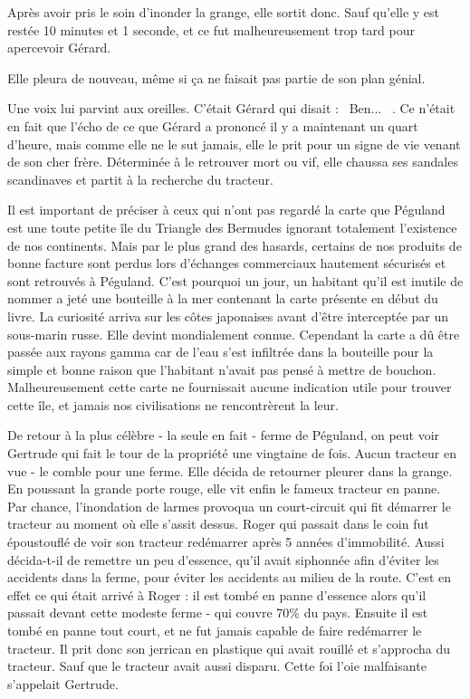 \documentclass[a5paper, 10pt, twoside]{book}
\newcommand{\cg}{\guillemotleft~}
\newcommand{\cd}{~\guillemotright}
\begin{document}
Après avoir pris le soin d’inonder la grange, elle sortit donc. Sauf qu'elle y est restée 10 minutes et 1 seconde, et ce fut malheureusement trop tard pour apercevoir Gérard.

Elle pleura de nouveau, même si ça ne faisait pas partie de son plan génial.

Une voix lui parvint aux oreilles. C'était Gérard qui disait : \cg Ben... \cd. Ce n'était en fait que l'écho de ce que Gérard a prononcé il y a maintenant un quart d'heure, mais comme elle ne le sut jamais, elle le prit pour un signe de vie venant de son cher frère. Déterminée à le retrouver mort ou vif, elle chaussa ses sandales scandinaves et partit à la recherche du tracteur.

Il est important de préciser à ceux qui n'ont pas regardé la carte que Péguland est une toute petite île du Triangle des Bermudes ignorant totalement l'existence de nos continents. Mais par le plus grand des hasards, certains de nos produits de bonne facture sont perdus lors d'échanges commerciaux hautement sécurisés et sont retrouvés à Péguland. C'est pourquoi un jour, un habitant qu'il est inutile de nommer a jeté une bouteille à la mer contenant la carte présente en début du livre. La curiosité arriva sur les côtes japonaises avant d'être interceptée par un sous-marin russe. Elle devint mondialement connue. Cependant la carte a dû être passée aux rayons gamma car de l'eau s'est infiltrée dans la bouteille pour la simple et bonne raison que l'habitant n'avait pas pensé à mettre de bouchon. Malheureusement cette carte ne fournissait aucune indication utile pour trouver cette île, et jamais nos civilisations ne rencontrèrent la leur.

De retour à la plus célèbre - la seule en fait - ferme de Péguland, on peut voir Gertrude qui fait le tour de la propriété une vingtaine de fois. Aucun tracteur en vue - le comble pour une ferme. Elle décida de retourner pleurer dans la grange. En poussant la grande porte rouge, elle vit enfin le fameux tracteur en panne. Par chance, l'inondation de larmes provoqua un court-circuit qui fit démarrer le tracteur au moment où elle s'assit dessus. Roger qui passait dans le coin fut époustouflé de voir son tracteur redémarrer après 5 années d'immobilité. Aussi décida-t-il de remettre un peu d'essence, qu'il avait siphonnée afin d'éviter les accidents dans la ferme, pour éviter les accidents au milieu de la route. C'est en effet ce qui était arrivé à Roger : il est tombé en panne d'essence alors qu'il passait devant cette modeste ferme - qui couvre 70\% du pays. Ensuite il est tombé en panne tout court, et ne fut jamais capable de faire redémarrer le tracteur. Il prit donc son jerrican en plastique qui avait rouillé et s'approcha du tracteur. Sauf que le tracteur avait aussi disparu. Cette foi l'oie malfaisante s'appelait Gertrude.
\end{document}
